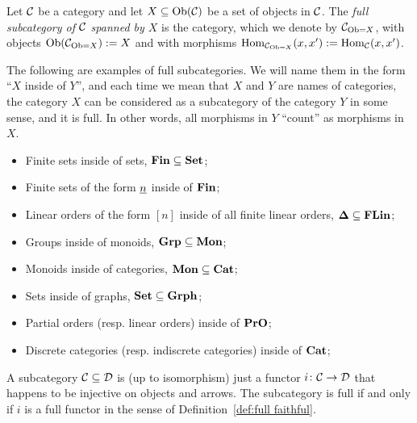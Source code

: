 \documentclass[CT4S-EN-RU]{subfiles}
\begin{document}
\begin{definitionENG}\label{def:full subcategory}
Let $\mathcal{C}$ be a category and let $X\subseteq\textnormal{Ob}(\mathcal{C})$ be a set of objects in $\mathcal{C}$. The {\em full subcategory of $\mathcal{C}$ spanned by $X$} is the category, which we denote by $\mathcal{C}_{\textnormal{Ob}=X}$, with objects $\textnormal{Ob}(\mathcal{C}_{\textnormal{Ob}=X}):=X$ and with morphisms $\textnormal{Hom}_{\mathcal{C}_{\textnormal{Ob}=X}}(x,x'):=\textnormal{Hom}_\mathcal{C}(x,x')$.
\end{definitionENG}

\begin{definitionRUS}\label{def:full subcategory}
\end{definitionRUS}

\begin{exampleENG}
The following are examples of full subcategories. We will name them in the form “$X$ inside of $Y$”, and each time we mean that $X$ and $Y$ are names of categories, the category $X$ can be considered as a subcategory of the category $Y$ in some sense, and it is full. In other words, all morphisms in $Y$ “count” as morphisms in $X$.
\begin{itemize}
\item Finite sets inside of sets, ${\mathbf{Fin}}\subseteq{\mathbf{Set}}$;
\item Finite sets of the form $\underline{n}$ inside of ${\mathbf{Fin}}$;
\item Linear orders of the form $[n]$ inside of all finite linear orders, ${\mathbf{\Delta}}\subseteq{\mathbf{FLin}}$;
\item Groups inside of monoids, ${\mathbf{Grp}}\subseteq{\mathbf{Mon}}$;
\item Monoids inside of categories, ${\mathbf{Mon}}\subseteq{\mathbf{Cat}}$;
\item Sets inside of graphs, ${\mathbf{Set}}\subseteq{\mathbf{Grph}}$;
\item Partial orders (resp. linear orders) inside of ${\mathbf{PrO}}$;
\item Discrete categories (resp. indiscrete categories) inside of ${\mathbf{Cat}}$;
\end{itemize}
\end{exampleENG}

\begin{exampleRUS}
\end{exampleRUS}

\begin{remarkENG}
A subcategory $\mathcal{C}\subseteq\mathcal{D}$ is (up to isomorphism) just a functor $i\colon\mathcal{C}\rightarrow\mathcal{D}$ that happens to be injective on objects and arrows. The subcategory is full if and only if $i$ is a full functor in the sense of Definition~\ref{def:full faithful}.
\end{remarkENG}
\end{document}
